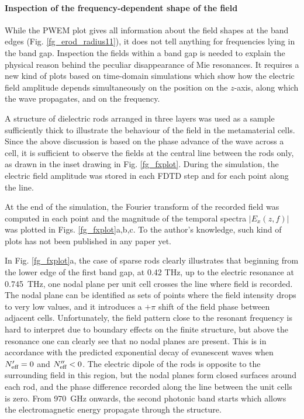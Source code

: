 \paragraph{Inspection of the frequency-dependent shape of the field}%
While the PWEM plot gives all information about the field shapes at the band edges (Fig. \ref{fg_erod_radius11}), it does not tell anything for frequencies lying in the band gap. Inspection the fields within a band gap  is needed to explain the physical reason behind the peculiar disappearance of Mie resonances. It requires a new kind of plots based on time-domain simulations which show how the electric field amplitude depends simultaneously on the position on the  $z$-axis, along which the wave propagates, and on the frequency.

A structure of dielectric rods arranged in three layers was used as a  sample sufficiently thick to illustrate the behaviour of the field in the metamaterial cells. Since the above discussion is based on the phase advance of the wave across a cell, it is sufficient to observe the fields at the central line between the rods only, as drawn in the inset drawing in Fig. \ref{fg_fxplot}.
During the simulation, the electric field amplitude was stored in each FDTD step and for each point along the line.

At the end of the simulation, the Fourier transform of the recorded field was computed in each point and the magnitude of the temporal spectra $|E_x(z, f)|$ was plotted in Figs. \ref{fg_fxplot}a,b,c. To the author's knowledge, such kind of plots has not been published in any paper yet. 

In Fig. \ref{fg_fxplot}a, the case of sparse rods clearly illustrates that beginning from the lower edge of the first band gap, at 0.42 THz, up to the electric resonance at 0.745~THz, one nodal plane per unit cell crosses the line where field is recorded. The nodal plane can be identified as sets of points where the field intensity drops to very low values, and it introduces a $+\pi$ shift of the field phase between adjacent cells. 
Unfortunately, the field pattern close to the resonant frequency is hard to interpret due to boundary effects on the finite structure, but above the resonance one can clearly see that no nodal planes are present. This is in accordance with the predicted exponential decay of evanescent waves when $N_{\text{eff} }' = 0$ and $N_{\text{eff} }'' < 0$. The electric dipole of the rods is opposite to the surrounding field in this region, but the nodal planes form closed surfaces around each rod, and the phase difference recorded along the line between the unit cells is zero. From 970~GHz onwards, the second photonic band starts which allows the electromagnetic energy propagate through the structure.

